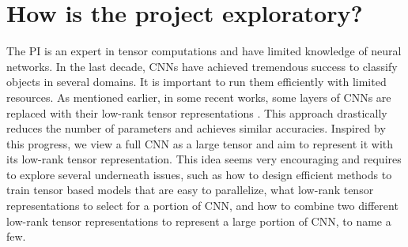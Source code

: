\documentclass[11pt]{article}
\begin{document}










\section{How is the project exploratory?}

The PI is an expert in tensor computations and have limited knowledge of neural networks. In the last decade,  CNNs have achieved tremendous success to classify objects in several domains. It is important to run them efficiently with limited resources. As mentioned earlier, in some recent works, some layers of CNNs are replaced with their low-rank tensor representations . This approach drastically reduces the number of parameters and achieves similar accuracies. Inspired by this progress, we view a full CNN as a large tensor and aim to represent it with its low-rank tensor representation. This idea seems very encouraging and requires to explore several underneath issues, such as how to design efficient methods to train tensor based models that are easy to parallelize, what low-rank tensor representations to select for a portion of CNN, and how to combine  two different low-rank tensor representations  to represent a large portion of CNN, to name a few.
\end{document}
